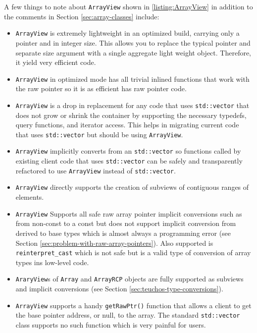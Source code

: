 \documentclass[pdf,ps2pdf,11pt]{SANDreport}
\begin{document}
A few things to note about {}\texttt{ArrayView} shown in
{}\ref{listing:ArrayView} in addition to the comments in Section
{}\ref{sec:array-classes} include:

\begin{itemize}

{}\item{}{}\texttt{ArrayView} is extremely lightweight in an optimized
build, carrying only a pointer and in integer size.  This allows you
to replace the typical pointer and separate size argument with a
single aggregate light weight object.  Therefore, it yield very
efficient code.

{}\item{}\texttt{ArrayView} in optimized mode has all trivial inlined
functions that work with the raw pointer so it is as efficient has raw
pointer code.

{}\item{}{}\texttt{ArrayView} is a drop in replacement for any code
that uses {}\texttt{std::vector} that does not grow or shrink the
container by supporting the necessary typedefs, query functions, and
iterator access.  This helps in migrating current code that uses
{}\texttt{std::vector} but should be using {}\texttt{ArrayView}.

{}\item{}{}\texttt{ArrayView} implicitly converts from an
{}\texttt{std::vector} so functions called by existing client code
that uses {}\texttt{std::vector} can be safely and transparently
refactored to use {}\texttt{ArrayView} instead of
{}\texttt{std::vector}.

{}\item{}\texttt{ArrayView} directly supports the creation of subviews
of contiguous ranges of elements.

{}\item{}\texttt{ArrayView} Supports all safe raw array pointer
implicit conversions such as from non-const to a const but does not
support implicit conversion from derived to base types which is almost
always a programming error (see Section
{}\ref{sec:problem-with-raw-array-pointers}).  Also supported is
{}\texttt{reinterpret\_cast} which is not safe but is a valid type of
conversion of array types ins low-level code.

{}\item{}\texttt{AraryView}s of {}\texttt{Array} and
{}\texttt{ArrayRCP} objects are fully supported as subviews and
implicit conversions (see Section
{}\ref{sec:teuchos-type-conversions}).

{}\item{}\texttt{ArrayView} supports a handy {}\texttt{getRawPtr()}
function that allows a client to get the base pointer address, or
null, to the array.  The standard {}\texttt{std::vector} class
supports no such function which is very painful for users.

\end{itemize}
\end{document}
